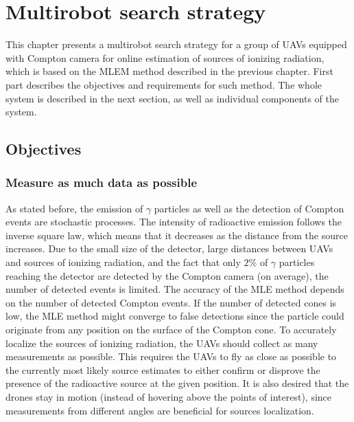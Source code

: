 
\chapter{Multirobot search strategy\label{chap:methods_robotics}}

This chapter presents a multirobot search strategy for a group of \ac{UAV}s equipped with Compton camera for online estimation of sources of ionizing radiation, which is based on the \ac{MLEM} method described in the previous chapter.
First part describes the objectives and requirements for such method.
The whole system is described in the next section, as well as individual components of the system.
\section{Objectives}

\subsection{Measure as much data as possible}
As stated before, the emission of $\gamma$ particles as well as the detection of Compton events are stochastic processes.
The intensity of radioactive emission follows the inverse square law, which means that it decreases as the distance from the source increases.
Due to the small size of the detector, large distances between \ac{UAV}s and sources of ionizing radiation, and the fact that only $2\%$ of $\gamma$ particles reaching the detector are detected by the Compton camera (on average), the number of detected events is limited.
The accuracy of the \ac{MLE} method depends on the number of detected Compton events.
If the number of detected cones is low, the \ac{MLE} method might converge to false detections since the particle could originate from any position on the surface of the Compton cone.
To accurately localize the sources of ionizing radiation, the \ac{UAV}s should collect as many measurements as possible.
This requires the \ac{UAV}s to fly as close as possible to the currently most likely source estimates to either confirm or disprove the presence of the radioactive source at the given position.
It is also desired that the drones stay in motion (instead of hovering above the points of interest), since measurements from different angles are beneficial for sources localization.

